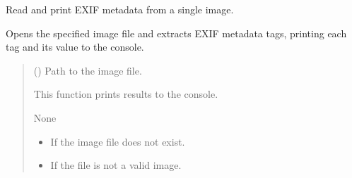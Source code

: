 \documentclass[letterpaper,10pt,english]{sphinxmanual}
\begin{document}
\begin{fulllineitems}
\label{\detokenize{modules/src.data_intake.data_intake.utils:src.data_intake.data_intake.utils.tagReader}}
\pysigstartsignatures
\pysiglinewithargsret
{}
{}
{}
\pysigstopsignatures
\sphinxAtStartPar
Read and print EXIF metadata from a single image.

\sphinxAtStartPar
Opens the specified image file and extracts EXIF metadata tags,
printing each tag and its value to the console.
\begin{quote}\begin{description}
\sphinxAtStartPar
{} () \textendash{} Path to the image file.

\sphinxAtStartPar
This function prints results to the console.

\sphinxAtStartPar
None

\begin{itemize}
\item {} 
\sphinxAtStartPar
{} \textendash{} If the image file does not exist.

\item {} 
\sphinxAtStartPar
{} \textendash{} If the file is not a valid image.

\end{itemize}

\end{description}\end{quote}

\end{fulllineitems}

\end{document}
